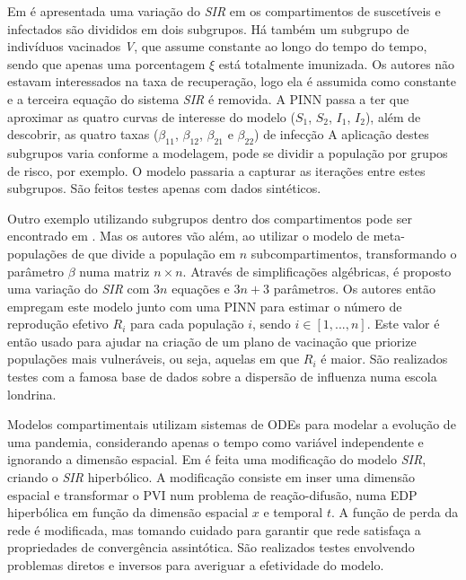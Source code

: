 Em \cite{ouyoussef-etal:24-subcompartimentos} é apresentada uma variação
do \textit{SIR} em os compartimentos de suscetíveis e infectados 
são divididos em dois subgrupos. Há também um subgrupo de indivíduos 
vacinados \textit{V}, que assume constante ao longo do tempo do tempo, 
sendo que apenas uma porcentagem $\xi$ está totalmente imunizada.
Os autores não estavam interessados na taxa de recuperação, logo ela é assumida
como constante e a terceira equação do sistema \textit{SIR} é removida. 
A PINN passa a ter que aproximar as quatro curvas de interesse do modelo 
($S_1$, $S_2$, $I_1$, $I_2$), 
além de descobrir, as quatro taxas 
($\beta_{11}$, $\beta_{12}$, $\beta_{21}$ e $\beta_{22}$) de infecção
A aplicação destes subgrupos varia conforme a modelagem, 
pode se dividir a população por grupos de risco, por exemplo.
O modelo passaria a capturar as iterações entre estes subgrupos.
São feitos testes apenas com dados sintéticos. 

Outro exemplo utilizando subgrupos dentro dos compartimentos pode ser encontrado
em \cite{arulandu-etal:23-vacinacao}. Mas os autores vão além, ao utilizar 
o modelo de meta-populações de \cite{jacquez:1988-modelagam-hiv-matriz} que 
divide a população em $n$ subcompartimentos, transformando o parâmetro $\beta$ 
numa matriz $n \times n$. Através de simplificações algébricas, é proposto uma 
variação do \textit{SIR} com $3n$ equações e $3n + 3$ parâmetros.
Os autores então empregam este modelo junto com uma PINN para estimar o número 
de reprodução efetivo $R_i$ para cada população $i$, sendo $i \in [1,...,n]$. 
Este valor é então usado para ajudar na criação de um plano de vacinação que 
priorize populações mais vulneráveis, ou seja, aquelas em que $R_i$ é maior.
São realizados testes com a famosa base de dados sobre a dispersão de influenza
numa escola londrina.  

Modelos compartimentais utilizam sistemas de ODEs para modelar a evolução
de uma pandemia, considerando apenas o tempo como variável independente e 
ignorando a dimensão espacial.
Em \cite{bertaglia-etal:22-sir-reacao-difusao} é feita uma modificação do 
modelo \textit{SIR}, criando o \textit{SIR} hiperbólico. 
A modificação consiste em inser uma dimensão espacial e transformar o PVI
num problema de reação-difusão, numa EDP hiperbólica em função da dimensão espacial $x$
e temporal $t$. A função de perda da rede é modificada, mas tomando cuidado
para garantir que rede satisfaça a propriedades de convergência assintótica.
São realizados testes envolvendo problemas diretos e inversos para averiguar
a efetividade do modelo.

